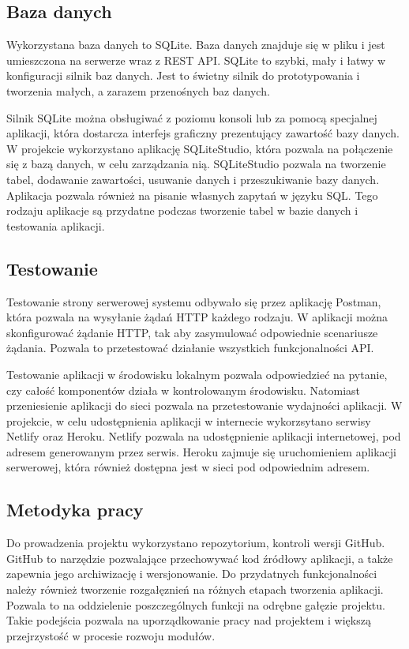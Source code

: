 \documentclass[a4paper,12pt]{book}
\begin{document}
\subsection {Baza danych}

Wykorzystana baza danych to SQLite. Baza danych znajduje się w pliku i jest umieszczona na serwerze wraz z REST API. SQLite to szybki, mały i łatwy w konfiguracji silnik baz danych. Jest to świetny silnik do prototypowania i tworzenia małych, a zarazem przenośnych baz danych.

Silnik SQLite można obsługiwać z poziomu konsoli lub za pomocą specjalnej aplikacji, która dostarcza interfejs graficzny prezentujący zawartość bazy danych. W projekcie wykorzystano aplikację SQLiteStudio, która pozwala na połączenie się z bazą danych, w celu zarządzania nią. SQLiteStudio pozwala na tworzenie tabel, dodawanie zawartości, usuwanie danych i przeszukiwanie bazy danych. Aplikacja pozwala również na pisanie własnych zapytań w języku SQL. Tego rodzaju aplikacje są przydatne podczas tworzenie tabel w bazie danych i testowania aplikacji.

\subsection{Testowanie}

Testowanie strony serwerowej systemu odbywało się przez aplikację Postman, która pozwala na wysyłanie żądań HTTP każdego rodzaju. W aplikacji można skonfigurować żądanie HTTP, tak aby zasymulować odpowiednie scenariusze żądania. Pozwala to przetestować działanie wszystkich funkcjonalności API.

Testowanie aplikacji w środowisku lokalnym pozwala odpowiedzieć na pytanie, czy całość komponentów działa w kontrolowanym środowisku. Natomiast przeniesienie aplikacji do sieci pozwala na przetestowanie wydajności aplikacji. W projekcie, w celu udostępnienia aplikacji w internecie wykorzsytano serwisy Netlify oraz Heroku. Netlify pozwala na udostępnienie aplikacji internetowej, pod adresem generowanym przez serwis. Heroku zajmuje się uruchomieniem aplikacji serwerowej, która również dostępna jest w sieci pod odpowiednim adresem.


\subsection{Metodyka pracy}

Do prowadzenia projektu wykorzystano repozytorium, kontroli wersji GitHub. GitHub to narzędzie pozwalające przechowywać kod źródłowy aplikacji, a także zapewnia jego archiwizację i wersjonowanie. Do przydatnych funkcjonalności należy również tworzenie rozgałęznień na różnych etapach tworzenia aplikacji. Pozwala to na oddzielenie poszczególnych funkcji na odrębne gałęzie projektu. Takie podejścia pozwala na uporządkowanie pracy nad projektem i większą przejrzystość w procesie rozwoju modułów.
\end{document}
